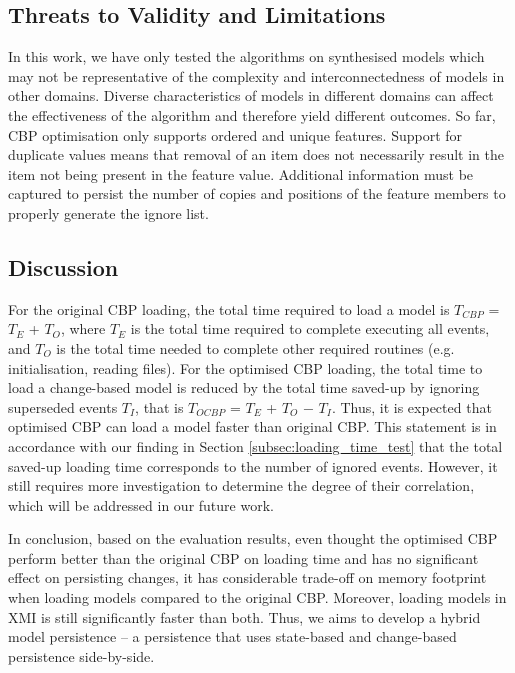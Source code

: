 \documentclass{llncs}
\begin{document}
{\vspace{-15pt}
\subsection{Threats to Validity and Limitations}
\label{sec:limitations_and_future_work}

\vspace{-10pt}
In this work, we have only tested the algorithms on synthesised  models which may not be representative of the complexity and interconnectedness of models in other domains. Diverse characteristics of models in different domains can affect the effectiveness of the algorithm and therefore yield different outcomes. So far, CBP optimisation only supports ordered and unique features. Support for duplicate values means that removal of an item does not necessarily result in the item not being present in the feature value. Additional information must be captured to persist the number of copies and positions of the feature members to properly generate the ignore list. 

\vspace{-15pt}
\subsection{Discussion}
\label{sec:discussion}

\vspace{-10pt}
For the original CBP loading, the total time required to load a model is $T_{CBP}$ = $T_E$ + $T_O$, where $T_E$ is the total time required to complete executing all events, and $T_O$ is the total time needed to complete other required routines (e.g. initialisation, reading files). For the optimised CBP loading, the total time to load a change-based model is reduced by the total time saved-up by ignoring superseded events $T_I$, that is $T_{OCBP}$ = $T_E$ + $T_O$ $-$ $T_I$. Thus, it is expected that optimised CBP can load a model faster than original CBP. This statement is in accordance with our finding in Section \ref{subsec:loading_time_test} that the total saved-up loading time corresponds to the number of ignored events. However, it still requires more investigation to determine the degree of their correlation, which will be addressed in our future work. 

In conclusion, based on the evaluation results, even thought the optimised CBP perform better than the original CBP on loading time and has no significant effect on persisting changes, it has considerable trade-off on memory footprint when loading models compared to the original CBP. Moreover, loading models in XMI is still significantly faster than both. Thus, we aims to develop a hybrid model persistence -- a persistence that uses state-based and change-based persistence side-by-side.

}
\end{document}
